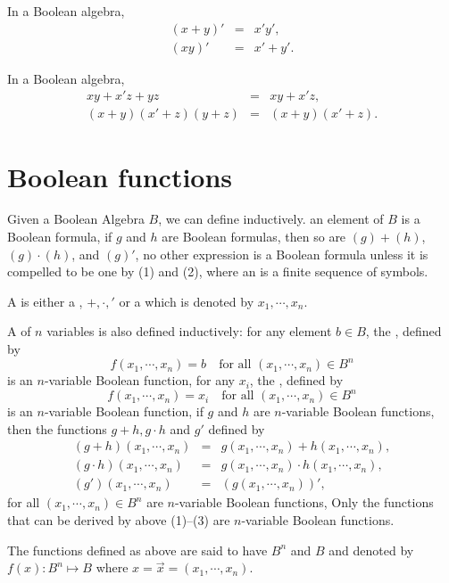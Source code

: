 \documentclass{myproc}
\begin{document}
\begin{theorem}
In a Boolean algebra,
\begin{eqnarray*}
	(x+y)' & = & x'y',\\
	(xy)' & = & x' + y'.
\end{eqnarray*}
\end{theorem}


\begin{theorem}[Consensus]
In a Boolean algebra,
\begin{eqnarray*}
	xy + x'z + yz & = & xy + x'z,\\
	(x + y)(x' + z)(y+z) & = & (x+y)(x'+z).
\end{eqnarray*}
\end{theorem}

\section{Boolean functions}
\begin{definition}
Given a Boolean Algebra $B$, we can define  
inductively.
\ben
\w [(1)] an element of $B$ is a Boolean formula,
\w [(2)] if $g$ and $h$ are Boolean formulas, then so are
	$(g) + (h)$, $(g)\cdot(h)$, and $(g)'$,
\w [(3)] no other expression is a Boolean formula unless it is
	compelled to be one by (1) and (2),
\een
where an  is a finite sequence of symbols.
\end{definition}
A  is either a , $+, \cdot, '$ or 
a 
which is denoted by $x_1, \cdots, x_n$.

\begin{definition}
A  of $n$ variables is also defined inductively:
\ben
\w [(1)] for any element $b \in B$, the , defined by
	\[f(x_1, \cdots, x_n) = b  \quad \mbox{for all\ \  $(x_1, \cdots,
x_n) \in B^n$} \]
	is an $n$-variable Boolean function,
\w [(2)] for any $x_i$, the , defined by
	\[f(x_1, \cdots, x_n) = x_i \quad \mbox{for all\ \  $(x_1, \cdots,
x_n) \in B^n$} \]
	is an $n$-variable Boolean function,
\w [(3)] if $g$ and $h$ are $n$-variable Boolean functions,
	then the functions $g+h, g\cdot{}h$ and $g'$ defined by
\begin{eqnarray*}
(g+h)(x_1, \cdots, x_n) & = & g(x_1,\cdots,x_n) + h(x_1,\cdots,x_n),\\
(g\cdot{}h)(x_1, \cdots, x_n) & = & g(x_1,\cdots,x_n) \cdot 
	h(x_1,\cdots,x_n),\\
(g')(x_1, \cdots, x_n) & = & (g(x_1,\cdots,x_n))',
\end{eqnarray*}
for all $(x_1,\cdots, x_n) \in B^n$ are $n$-variable Boolean
functions,
\w [(4)] Only the functions that can be derived by above (1)--(3) are
	$n$-variable Boolean functions.
\een
\end{definition}
The functions defined as above are said to have  $B^n$
and  $B$ and denoted by $f(x): B^n \mapsto B$ where
$x = \vec{x} = (x_1, \cdots, x_n)$.
\end{document}

